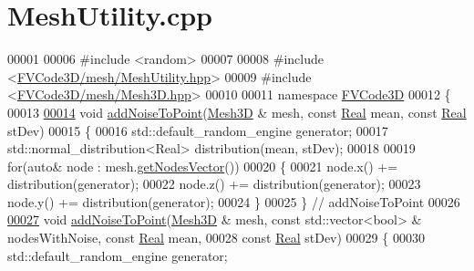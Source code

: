 \hypertarget{MeshUtility_8cpp_source}{}\section{Mesh\+Utility.\+cpp}
\label{MeshUtility_8cpp_source}

\begin{DoxyCode}
00001 
00006 \textcolor{preprocessor}{#include <random>}
00007 
00008 \textcolor{preprocessor}{#include <\hyperlink{MeshUtility_8hpp}{FVCode3D/mesh/MeshUtility.hpp}>}
00009 \textcolor{preprocessor}{#include <\hyperlink{Mesh3D_8hpp}{FVCode3D/mesh/Mesh3D.hpp}>}
00010 
00011 \textcolor{keyword}{namespace }\hyperlink{namespaceFVCode3D}{FVCode3D}
00012 \{
00013 
\hypertarget{MeshUtility_8cpp_source.tex_l00014}{}\hyperlink{namespaceFVCode3D_a9f604a7093f7f7323727e7ba28d8ce75}{00014} \textcolor{keywordtype}{void} \hyperlink{namespaceFVCode3D_a9f604a7093f7f7323727e7ba28d8ce75}{addNoiseToPoint}(\hyperlink{classFVCode3D_1_1Mesh3D}{Mesh3D} & mesh, \textcolor{keyword}{const} \hyperlink{namespaceFVCode3D_a40c1f5588a248569d80aa5f867080e83}{Real} mean, \textcolor{keyword}{const} 
      \hyperlink{namespaceFVCode3D_a40c1f5588a248569d80aa5f867080e83}{Real} stDev)
00015 \{
00016     std::default\_random\_engine generator;
00017     std::normal\_distribution<Real> distribution(mean, stDev);
00018 
00019     \textcolor{keywordflow}{for}(\textcolor{keyword}{auto}& node : mesh.\hyperlink{classFVCode3D_1_1Mesh3D_a04162ec60e0fe52674b3ecbb7de1185c}{getNodesVector}())
00020     \{
00021         node.x() += distribution(generator);
00022         node.z() += distribution(generator);
00023         node.y() += distribution(generator);
00024     \}
00025 \} \textcolor{comment}{// addNoiseToPoint}
00026 
\hypertarget{MeshUtility_8cpp_source.tex_l00027}{}\hyperlink{namespaceFVCode3D_a83503dfaf8e3d2594eda363a28c5425a}{00027} \textcolor{keywordtype}{void} \hyperlink{namespaceFVCode3D_a9f604a7093f7f7323727e7ba28d8ce75}{addNoiseToPoint}(\hyperlink{classFVCode3D_1_1Mesh3D}{Mesh3D} & mesh, \textcolor{keyword}{const} std::vector<bool> & nodesWithNoise, \textcolor{keyword}{const} 
      \hyperlink{namespaceFVCode3D_a40c1f5588a248569d80aa5f867080e83}{Real} mean,
00028     \textcolor{keyword}{const} \hyperlink{namespaceFVCode3D_a40c1f5588a248569d80aa5f867080e83}{Real} stDev)
00029 \{
00030     std::default\_random\_engine generator;

\end{DoxyCode}
